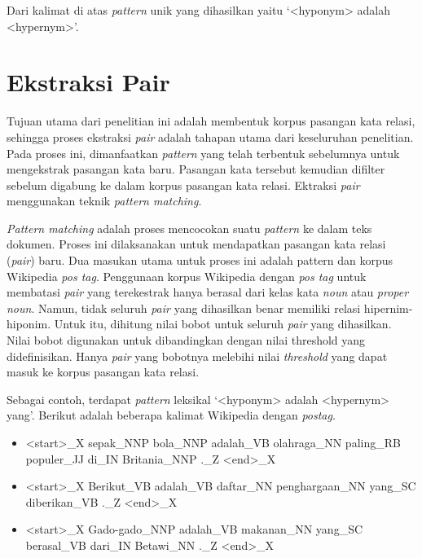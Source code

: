 \noindent Dari kalimat di atas \textit{pattern} unik yang dihasilkan yaitu `<hyponym> adalah <hypernym>'.


\section{Ekstraksi Pair}
Tujuan utama dari penelitian ini adalah membentuk korpus pasangan kata relasi, sehingga proses ekstraksi \textit{pair} adalah tahapan utama dari keseluruhan penelitian. Pada proses ini, dimanfaatkan \textit{pattern} yang telah terbentuk sebelumnya untuk mengekstrak pasangan kata baru. Pasangan kata tersebut kemudian difilter sebelum digabung ke dalam korpus pasangan kata relasi. Ektraksi \textit{pair} menggunakan teknik \textit{pattern matching}.

\textit{Pattern matching} adalah proses mencocokan suatu \textit{pattern} ke dalam teks dokumen. Proses ini dilaksanakan untuk mendapatkan pasangan kata relasi (\textit{pair}) baru. Dua masukan utama untuk proses ini adalah pattern dan korpus Wikipedia \textit{pos tag}. Penggunaan korpus Wikipedia dengan \textit{pos tag} untuk membatasi \textit{pair} yang terekestrak hanya berasal dari kelas kata \textit{noun} atau \textit{proper noun}. Namun, tidak seluruh \textit{pair} yang dihasilkan benar memiliki relasi hipernim-hiponim. Untuk itu, dihitung nilai bobot untuk seluruh \textit{pair} yang dihasilkan. Nilai bobot digunakan untuk dibandingkan dengan nilai threshold yang didefinisikan. Hanya \textit{pair} yang bobotnya melebihi nilai \textit{threshold} yang dapat masuk ke korpus pasangan kata relasi.

Sebagai contoh, terdapat \textit{pattern} leksikal `<hyponym> adalah <hypernym> yang'. Berikut adalah beberapa kalimat Wikipedia dengan \textit{postag}.

\begin{itemize}
  \item <start>\_X sepak\_NNP bola\_NNP adalah\_VB olahraga\_NN paling\_RB populer\_JJ di\_IN Britania\_NNP .\_Z <end>\_X
  \item <start>\_X Berikut\_VB adalah\_VB daftar\_NN penghargaan\_NN yang\_SC diberikan\_VB .\_Z <end>\_X
  \item <start>\_X Gado-gado\_NNP adalah\_VB makanan\_NN yang\_SC berasal\_VB dari\_IN Betawi\_NN .\_Z <end>\_X
\end{itemize}

